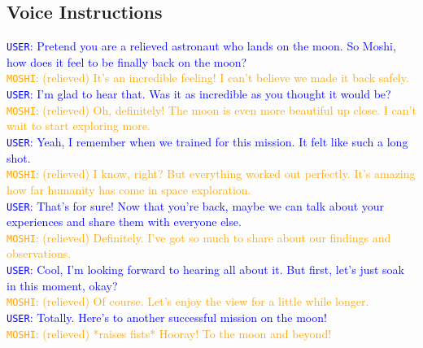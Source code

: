 \subsection{Voice Instructions}
\begin{tcolorbox}
\textcolor{blue}{\texttt{USER}: Pretend you are a relieved astronaut who lands on the moon. So Moshi, how does it feel to be finally back on the moon?} \\
\textcolor{orange}{\texttt{MOSHI}: (relieved)  It's an incredible feeling! I can't believe we made it back safely.} \\
\textcolor{blue}{\texttt{USER}: I'm glad to hear that. Was it as incredible as you thought it would be?} \\
\textcolor{orange}{\texttt{MOSHI}: (relieved)  Oh, definitely! The moon is even more beautiful up close. I can't wait to start exploring more.} \\
\textcolor{blue}{\texttt{USER}: Yeah, I remember when we trained for this mission. It felt like such a long shot.} \\
\textcolor{orange}{\texttt{MOSHI}: (relieved)  I know, right? But everything worked out perfectly. It's amazing how far humanity has come in space exploration.} \\
\textcolor{blue}{\texttt{USER}: That's for sure! Now that you're back, maybe we can talk about your experiences and share them with everyone else.} \\
\textcolor{orange}{\texttt{MOSHI}: (relieved)  Definitely. I've got so much to share about our findings and observations.} \\
\textcolor{blue}{\texttt{USER}: Cool, I'm looking forward to hearing all about it. But first, let's just soak in this moment, okay?} \\
\textcolor{orange}{\texttt{MOSHI}: (relieved)  Of course. Let's enjoy the view for a little while longer.} \\
\textcolor{blue}{\texttt{USER}:  Totally. Here's to another successful mission on the moon!} \\
\textcolor{orange}{\texttt{MOSHI}: (relieved) *raises fists* Hooray! To the moon and beyond!} \\
\end{tcolorbox}

